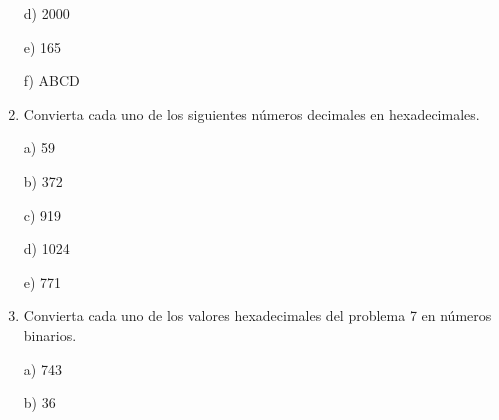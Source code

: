 \documentclass[a4paper, 12pt]{article}
\newcommand{\Aspace}{0.2cm}
\begin{document}
\begin{enumerate}
            \vspace{\Aspace} \par
            d) 2000
            \\ { \color{azul}  }

            \vspace{\Aspace} \par
            e) 165
            \\ { \color{azul}  }

            \vspace{\Aspace} \par
            f) ABCD
            \\ { \color{azul}  }


        \item Convierta cada uno de los siguientes números decimales en hexadecimales.
            \vspace{\Aspace} \par
            a) 59
            \\ { \color{azul}  }

            \vspace{\Aspace} \par
            b) 372
            \\ { \color{azul}  }

            \vspace{\Aspace} \par
            c) 919
            \\ { \color{azul}  }

            \vspace{\Aspace} \par
            d) 1024
            \\ { \color{azul}  }

            \vspace{\Aspace} \par
            e) 771
            \\ { \color{azul}  }


        \item Convierta cada uno de los valores hexadecimales del problema 7 en números binarios.
            \vspace{\Aspace} \par
            a) 743
            \\ { \color{azul}  }

            \vspace{\Aspace} \par
            b) 36
            \\ { \color{azul}  }


\end{enumerate}
\end{document}
